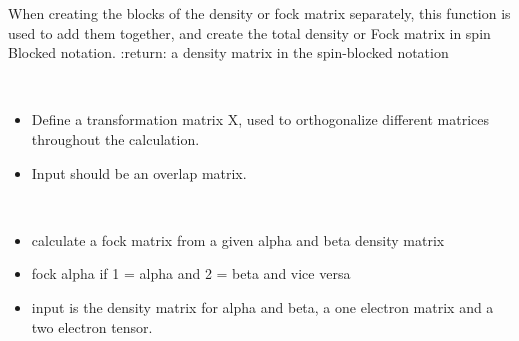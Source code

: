 \documentclass[letterpaper,10pt,english]{sphinxmanual}
\begin{document}

\begin{fulllineitems}
\label{\detokenize{SCF_functions:ghf.SCF_functions.spin_blocked}}
When creating the blocks of the density or fock matrix separately, this function is used to add them together,
and create the total density or Fock matrix in spin Blocked notation.
:return: a density matrix in the spin-blocked notation

\end{fulllineitems}


\begin{fulllineitems}
\label{\detokenize{SCF_functions:ghf.SCF_functions.trans_matrix}}~\begin{itemize}
\item {} 
Define a transformation matrix X, used to orthogonalize different matrices throughout the calculation.

\item {} 
Input should be an overlap matrix.

\end{itemize}

\end{fulllineitems}


\begin{fulllineitems}
\label{\detokenize{SCF_functions:ghf.SCF_functions.uhf_fock_matrix}}~\begin{itemize}
\item {} 
calculate a fock matrix from a given alpha and beta density matrix

\item {} 
fock alpha if 1 = alpha and 2 = beta and vice versa

\item {} 
input is the density matrix for alpha and beta, a one electron matrix and a two electron tensor.

\end{itemize}

\end{fulllineitems}
\end{document}
